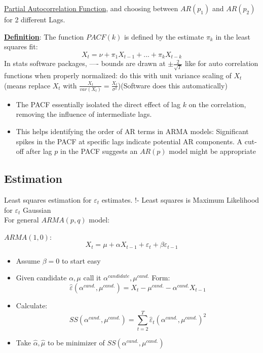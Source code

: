\underline{Partial Autocorrelation Function}, and choosing between $AR(p_1)$ and $AR(p_2)$ for 2 different Lags.

\textbf{\underline{Definition}}: \quad The function $PACF(k)$ is defined by the estimate $\pi_k$ in the least squares fit: \[
X_t=\nu +\pi_1 X_{t-1} +...+ \pi_k X_{t-k}
\]
In stats software packages, ---- bounds are drawn at $\pm \frac{2}{\sqrt{T}}$ like for auto correlation functions when properly normalized: do this with unit variance scaling of $X_t$ (means replace $X_t$ with $\frac{X_t}{var(X_t)}=\frac{X_t}{\sigma^2}$)(Software does this automatically)

\begin{itemize}
    \item The PACF essentially isolated the direct effect of lag $k$ on the correlation, removing the influence of intermediate lags.
    \item This helps identifying the order of AR terms in ARMA models: Significant spikes in the PACF at specific lags indicate potential AR components. A cut-off after lag $p$ in the PACF suggests an $AR(p)$ model might be appropriate
\end{itemize}

\subsection{Estimation}

Least squares estimation for $\varepsilon_t$ estimates. !- Least squares is Maximum Likelihood for $\varepsilon_t$ Gaussian \\

For general $ARMA(p,q)$ model:

$ARMA(1,0)$: \[
X_t=\mu+\alpha X_{t-1} + \varepsilon_t+\beta\varepsilon_{t-1}
\]
\begin{itemize}
    \item Assume $\beta=0$ to start easy
    \item[] Given candidate $\alpha, \mu$ call it $\alpha^{\textit{candidate}}, \mu^{\textit{cand.}}$ Form: \[\hat{\varepsilon}(\alpha^{\textit{cand.}},\mu^{\textit{cand.}}) = X_t -\mu^{\textit{cand.}} - \alpha^{\textit{cand.}}X_{t-1}
    \]
    \item[] Calculate: \[SS(\alpha^{\textit{cand.}},\mu^{\textit{cand.}})=\sum_{t=2}^T \hat{\varepsilon}_t(\alpha^{\textit{cand.}},\mu^{\textit{cand.}} )^2 \]
    \item[] Take $\hat{\alpha}, \hat{\mu}$ to be minimizer of $SS(\alpha^{\textit{cand.}},\mu^{\textit{cand.}})$
\end{itemize}

